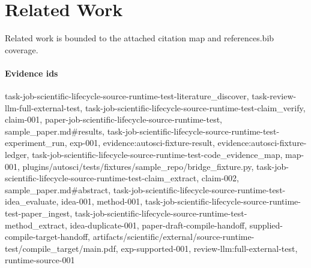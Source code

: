 \section{Related Work}
Related work is bounded to the attached citation map and references.bib coverage.

\paragraph{Evidence ids} task-job-scientific-lifecycle-source-runtime-test-literature\_discover, task-review-llm-full-external-test, task-job-scientific-lifecycle-source-runtime-test-claim\_verify, claim-001, paper-job-scientific-lifecycle-source-runtime-test, sample\_paper.md\#results, task-job-scientific-lifecycle-source-runtime-test-experiment\_run, exp-001, evidence:autosci-fixture-result, evidence:autosci-fixture-ledger, task-job-scientific-lifecycle-source-runtime-test-code\_evidence\_map, map-001, plugins/autosci/tests/fixtures/sample\_repo/bridge\_fixture.py, task-job-scientific-lifecycle-source-runtime-test-claim\_extract, claim-002, sample\_paper.md\#abstract, task-job-scientific-lifecycle-source-runtime-test-idea\_evaluate, idea-001, method-001, task-job-scientific-lifecycle-source-runtime-test-paper\_ingest, task-job-scientific-lifecycle-source-runtime-test-method\_extract, idea-duplicate-001, paper-draft-compile-handoff, supplied-compile-target-handoff, artifacts/scientific/external/source-runtime-test/compile\_target/main.pdf, exp-supported-001, review-llm:full-external-test, runtime-source-001
